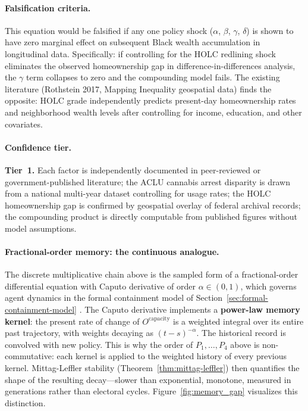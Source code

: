 \paragraph{Falsification criteria.}
This equation would be falsified if any one policy shock ($\alpha$, $\beta$, $\gamma$, $\delta$) is shown to have zero marginal effect on subsequent Black wealth accumulation in longitudinal data. Specifically: if controlling for the HOLC redlining shock eliminates the observed homeownership gap in difference-in-differences analysis, the $\gamma$ term collapses to zero and the compounding model fails. The existing literature (Rothstein 2017, Mapping Inequality geospatial data) finds the opposite: HOLC grade independently predicts present-day homeownership rates and neighborhood wealth levels after controlling for income, education, and other covariates.

\paragraph{Confidence tier.}
\textbf{Tier~1.} Each factor is independently documented in peer-reviewed or government-published literature; the ACLU cannabis arrest disparity is drawn from a national multi-year dataset controlling for usage rates; the HOLC homeownership gap is confirmed by geospatial overlay of federal archival records; the compounding product is directly computable from published figures without model assumptions.

\paragraph{Fractional-order memory: the continuous analogue.} The discrete multiplicative chain above is the sampled form of a fractional-order differential equation with Caputo derivative of order $\alpha \in (0,1)$, which governs agent dynamics in the formal containment model of Section~\ref{sec:formal-containment-model} \cite{li_mittag_leffler, kan_containment}. The Caputo derivative implements a \textbf{power-law memory kernel}: the present rate of change of $O^{\text{capacity}}$ is a weighted integral over its entire past trajectory, with weights decaying as $(t-s)^{-\alpha}$. The historical record is convolved with new policy. This is why the order of $P_1, \ldots, P_4$ above is non-commutative: each kernel is applied to the weighted history of every previous kernel. Mittag-Leffler stability (Theorem~\ref{thm:mittag-leffler}) then quantifies the shape of the resulting decay---slower than exponential, monotone, measured in generations rather than electoral cycles. Figure~\ref{fig:memory_gap} visualizes this distinction.

